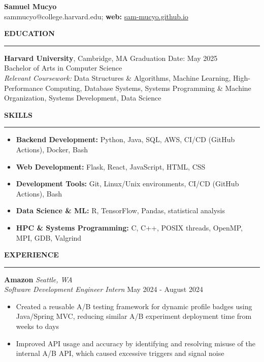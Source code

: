 \documentclass[11pt,a4paper]{article}
\newcommand{\sectionheading}[1]{\vspace{0.2cm}\textbf{\Large #1}\vspace{0.1cm}\hrule\vspace{0.3cm}}
\newcommand{\subheading}[1]{\textbf{#1}}
\newcommand{\daterange}[1]{\hfill{#1}}
\begin{document}
\begin{center}
    \textbf{\LARGE Samuel Mucyo}\\
    \vspace{0.3cm}
    sammucyo@college.harvard.edu; \textbf{web:} \href{https://sam-mucyo.github.io/}{sam-mucyo.github.io} \\
\end{center}


\sectionheading{EDUCATION}
\subheading{Harvard University}, Cambridge, MA \daterange{Graduation Date: May 2025}\\
Bachelor of Arts in Computer Science\\
\textit{Relevant Coursework:} Data Structures \& Algorithms, Machine Learning, High-Performance Computing, Database Systems, Systems Programming \& Machine Organization, Systems Development, Data Science

\sectionheading{SKILLS}
\begin{itemize}[leftmargin=*,nosep]
    \item \textbf{Backend Development:} Python, Java, SQL, AWS, CI/CD (GitHub Actions), Docker, Bash
    \item \textbf{Web Development:} Flask, React, JavaScript, HTML, CSS
    \item \textbf{Development Tools:} Git, Linux/Unix environments, CI/CD (GitHub Actions), Bash
    \item \textbf{Data Science \& ML:} R, TensorFlow, Pandas, statistical analysis
    \item \textbf{HPC \& Systems Programming:} C, C++, POSIX threads, OpenMP, MPI, GDB, Valgrind
\end{itemize}

\sectionheading{EXPERIENCE}
\subheading{Amazon} \hfill \textit{Seattle, WA}\\
\textit{Software Development Engineer Intern} \daterange{May 2024 - August 2024}
\begin{itemize}[leftmargin=*,nosep]
    \item Created a reusable A/B testing framework for dynamic profile badges using Java/Spring MVC, reducing similar A/B experiment deployment time from weeks to days
    \item Improved API usage and accuracy by identifying and resolving misuse of the internal A/B API, which caused excessive triggers and signal noise
\end{itemize}
\end{document}
